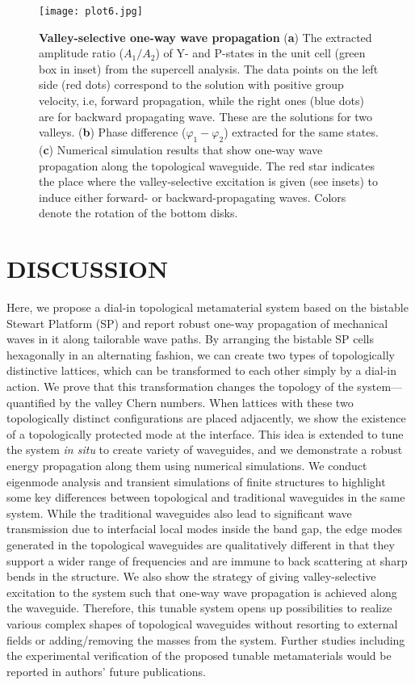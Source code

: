\documentclass[aps,preprint,onecolumn,showpacs,superscriptaddress,groupedaddress]{revtex4}  %
\begin{document}
\begin{figure}[!]
\centering
\texttt{[image: plot6.jpg]}
\caption{\textbf{Valley-selective one-way wave propagation} (\textbf{a}) The extracted amplitude ratio ($A_1/A_2$) of Y- and P-states in the unit cell (green box in inset) from the supercell analysis. The data points on the left side (red dots) correspond to the solution with positive group velocity, i.e, forward propagation, while the right ones (blue dots) are for backward propagating wave. These are the solutions for two valleys. (\textbf{b}) Phase difference (${\varphi _1} - {\varphi _2}$) extracted for the same states. (\textbf{c}) Numerical simulation results that show one-way wave propagation along the topological waveguide. The red star indicates the place where the valley-selective excitation is given (see insets) to induce either forward-  or backward-propagating waves. Colors denote the rotation of the bottom disks.}
\label{fig6}
\end{figure} 


\section*{DISCUSSION}
Here, we propose a dial-in topological metamaterial system based on the bistable Stewart Platform (SP) and report robust one-way propagation of mechanical waves in it along tailorable wave paths. By arranging the bistable SP cells hexagonally in an alternating fashion, we can create two types of topologically distinctive lattices, which can be transformed to each other simply by a dial-in action. We prove that this transformation changes the topology of the system---quantified by the valley Chern numbers. When lattices with these two topologically distinct configurations are placed adjacently, we show the existence of a topologically protected mode at the interface. This idea is extended to tune the system \textit{in situ} to create variety of waveguides, and we demonstrate a robust energy propagation along them using numerical simulations. We conduct eigenmode analysis and transient simulations of finite structures to highlight some key differences between topological and traditional waveguides in the same system. While the traditional waveguides also lead to significant wave transmission due to interfacial local modes inside the band gap, the edge modes generated in the topological waveguides are qualitatively different in that they support a wider range of frequencies and are immune to back scattering at sharp bends in the structure. We also show the strategy of giving valley-selective excitation to the system such that one-way wave propagation is achieved along the waveguide. Therefore, this tunable system opens up possibilities to realize various complex shapes of topological waveguides without resorting to external fields or adding/removing the masses from the system. Further studies including the experimental verification of the proposed tunable metamaterials would be reported in authors' future publications. 
\end{document}
